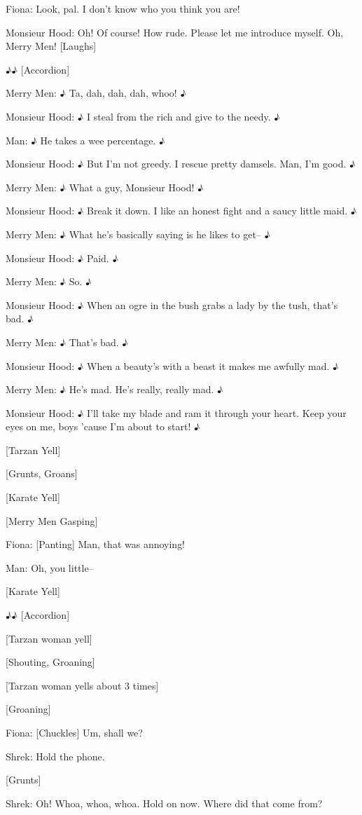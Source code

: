 \documentclass{article}
\begin{document}
Fiona:
Look, pal. I don't know who you think you are!

Monsieur Hood:
Oh! Of course! How rude. Please let me introduce myself. Oh, Merry Men! [Laughs]

♪♪ [Accordion]

Merry Men:
♪ Ta, dah, dah, dah, whoo! ♪

Monsieur Hood:
♪ I steal from the rich and give to the needy. ♪

Man:
♪ He takes a wee percentage. ♪

Monsieur Hood:
♪ But I'm not greedy. I rescue pretty damsels. Man, I'm good. ♪

Merry Men:
♪ What a guy, Monsieur Hood! ♪

Monsieur Hood:
♪ Break it down. I like an honest fight and a saucy little maid. ♪

Merry Men:
♪ What he's basically saying is he likes to get-- ♪

Monsieur Hood:
♪ Paid. ♪

Merry Men:
♪ So. ♪

Monsieur Hood:
♪ When an ogre in the bush grabs a lady by the tush, that's bad. ♪

Merry Men:
♪ That's bad. ♪

Monsieur Hood:
♪ When a beauty's with a beast it makes me awfully mad. ♪

Merry Men:
♪ He's mad. He's really, really mad. ♪

Monsieur Hood:
♪ I'll take my blade and ram it through your heart. Keep your eyes on me, boys 'cause I'm about to start! ♪

[Tarzan Yell]

[Grunts, Groans]

[Karate Yell]

[Merry Men Gasping]

Fiona:
[Panting] Man, that was annoying!

Man:
Oh, you little--

[Karate Yell]

♪♪ [Accordion]

[Tarzan woman yell]

[Shouting, Groaning]

[Tarzan woman yells about 3 times]

[Groaning]

Fiona:
[Chuckles] Um, shall we?

Shrek:
Hold the phone.

[Grunts]

Shrek:
Oh! Whoa, whoa, whoa. Hold on now. Where did that come from?
\end{document}
